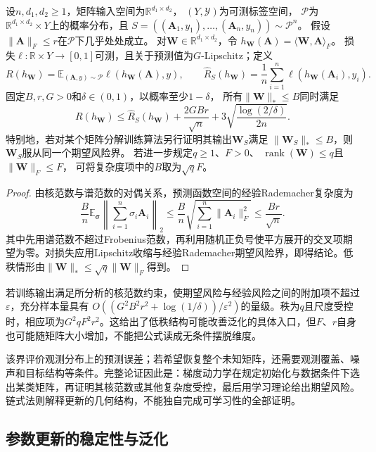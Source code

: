 \begin{theorem}[基于谱结构的矩阵预测期望风险]
\label{thm:nuclear-norm-generalization}
设$n,d_1,d_2\geq1$，矩阵输入空间为$\mathbb R^{d_1\times d_2}$，
$(Y,\mathcal Y)$为可测标签空间，
$\mathcal P$为$\mathbb R^{d_1\times d_2}\times Y$上的概率分布，且
$S=((\bm A_1,y_1),\ldots,(\bm A_n,y_n))\sim\mathcal P^n$。
假设$\|\bm A\|_F\leq r$在$\mathcal P$下几乎处处成立。
对$\bm W\in\mathbb R^{d_1\times d_2}$，令
$h_{\bm W}(\bm A)=\langle\bm W,\bm A\rangle_F$。
损失$\ell:\mathbb R\times Y\to[0,1]$可测，且关于预测值为$G$-Lipschitz；定义
\[
 R(h_{\bm W})=\mathbb E_{(\bm A,y)\sim\mathcal P}
                    \ell(h_{\bm W}(\bm A),y),\qquad
 \hat R_S(h_{\bm W})=\frac1n\sum_{i=1}^n
                    \ell(h_{\bm W}(\bm A_i),y_i).
\]
固定$B,r,G>0$和$\delta\in(0,1)$，以概率至少$1-\delta$，
所有$\|\bm W\|_*\leq B$同时满足
\[
 R(h_{\bm W})\leq\hat R_S(h_{\bm W})
       +\frac{2GBr}{\sqrt n}
       +3\sqrt{\frac{\log(2/\delta)}{2n}}.
\]
特别地，若对某个矩阵分解训练算法另行证明其输出$\bm W_S$满足
$\|\bm W_S\|_*\leq B$，则$\bm W_S$服从同一个期望风险界。
若进一步规定$q\geq1$、$F>0$、
$\operatorname{rank}(\bm W)\leq q$且$\|\bm W\|_F\leq F$，
可将复杂度项中的$B$取为$\sqrt qF$。
\end{theorem}
\begin{proof}
由核范数与谱范数的对偶关系，预测函数空间的经验Rademacher复杂度为
\[
 \frac Bn\mathbb E_{\bm\sigma}
       \left\|\sum_{i=1}^n\sigma_i\bm A_i\right\|_2
 \leq\frac Bn\sqrt{\sum_{i=1}^n\|\bm A_i\|_F^2}
 \leq\frac{Br}{\sqrt n}.
\]
其中先用谱范数不超过Frobenius范数，再利用随机正负号使平方展开的交叉项期望为零。对损失应用Lipschitz收缩与经验Rademacher期望风险界，即得结论。低秩情形由$\|\bm W\|_*\leq\sqrt q\|\bm W\|_F$得到。
\end{proof}

若训练输出满足所分析的核范数约束，使期望风险与经验风险之间的附加项不超过$\varepsilon$，充分样本量具有
$O((G^2B^2r^2+\log(1/\delta))/\varepsilon^2)$的量级。秩为$q$且尺度受控时，相应项为$G^2qF^2r^2$。这给出了低秩结构可能改善泛化的具体入口，但$F$、$r$自身也可能随矩阵大小增加，不能把公式读成无条件摆脱维度。

该界评价观测分布上的预测误差；若希望恢复整个未知矩阵，还需要观测覆盖、噪声和目标结构等条件。完整论证因此是：梯度动力学在规定初始化与数据条件下选出某类矩阵，再证明其核范数或其他复杂度受控，最后用学习理论给出期望风险。链式法则解释更新的几何结构，不能独自完成可学习性的全部证明。

\subsection{参数更新的稳定性与泛化}

